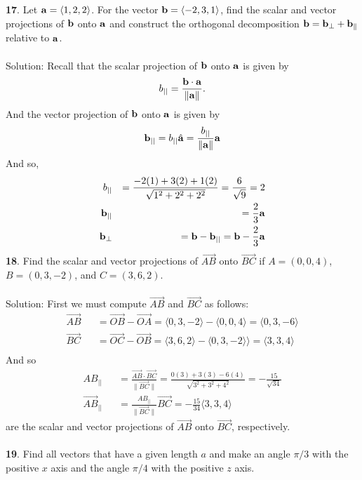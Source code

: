 \documentclass[12pt]{amsbook}
\newcommand{\la}{\langle}
\newcommand{\ra}{\rangle}
\begin{document}
\\
\\
{\small\bf 17}. Let ${\bf a}=\la 1,2,2\ra$. For the vector
${\bf b}=\la -2,3,1\ra$, find the scalar and vector 
projections of ${\bf b}$ onto ${\bf a}$ and construct
the orthogonal decomposition ${\bf b}={\bf b}_\bot+
{\bf b}_\|$ relative to ${\bf a}$.\\
\\
{\sc Solution}:
Recall that the scalar projection of $\bf b$ onto $\bf a$ is given by 
$$b_{||}=\frac{{\bf b}\cdot{\bf a}}{\|{\bf a}\|}.$$
And the vector projection of $\bf b$ onto $\bf a$ is given by
$${\bf b}_{||}=b_{||}\hat{\bf a}=\frac{b_{||}}{\|{\bf a}\|}\bf a$$
And so,
\begin{eqnarray*}
b_{||}&&=\frac{-2(1)+3(2)+1(2)}{\sqrt{1^2+2^2+2^2}}=\frac{6}{\sqrt{9}}=2\\
{\bf b}_{||}&&=\frac{2}{3}\bf a\\
{\bf b}_{\perp}&&={\bf b}-{\bf b}_{||}={\bf b}-\frac 23\bf a
\end{eqnarray*}
{\small\bf 18}. Find the scalar and vector projections of
$\overrightarrow{AB}$ onto $\overrightarrow{BC}$ if 
$A=(0,0,4)$, $B=(0,3,-2)$, and $C=(3,6,2)$.\\
\\
{\sc Solution}:
First we must compute $\overrightarrow{AB}$ and $\overrightarrow{BC}$ as follows:
\begin{eqnarray*}
\overrightarrow{AB}&&=\overrightarrow{OB}-\overrightarrow{OA}=\la 0,3,-2 \ra - \la 0,0,4 \ra = \la 0,3,-6 \ra\\
\overrightarrow{BC}&&=\overrightarrow{OC}-\overrightarrow{OB}=\la 3,6,2 \ra - \la 0,3,-2 \ra \ra = \la 3,3,4 \ra\\
\end{eqnarray*}
And so
\begin{eqnarray*}
{AB}_{||}&&=\frac{\overrightarrow{AB}\cdot\overrightarrow{BC}}{\|\overrightarrow{BC}\|}=\frac{0(3)+3(3)-6(4)}{\sqrt{3^2+3^2+4^2}}=-\frac{15}{\sqrt{34}}\\
\overrightarrow{AB}_{||}&&=\frac{{AB}_{||}}{\|\overrightarrow{BC}\|}{\overrightarrow{BC}}=-\frac {15}{34}\la 3,3,4 \ra
\end{eqnarray*}
are the scalar and vector projections of $\overrightarrow{AB}$ onto $\overrightarrow{BC}$, respectively.
\\
\\
{\small\bf 19}. Find all vectors that have 
a given length $a$ and make an angle $\pi/3$ with the
positive $x$ axis 
and the angle $\pi/4$ with the positive $z$ axis. \\
\end{document}
